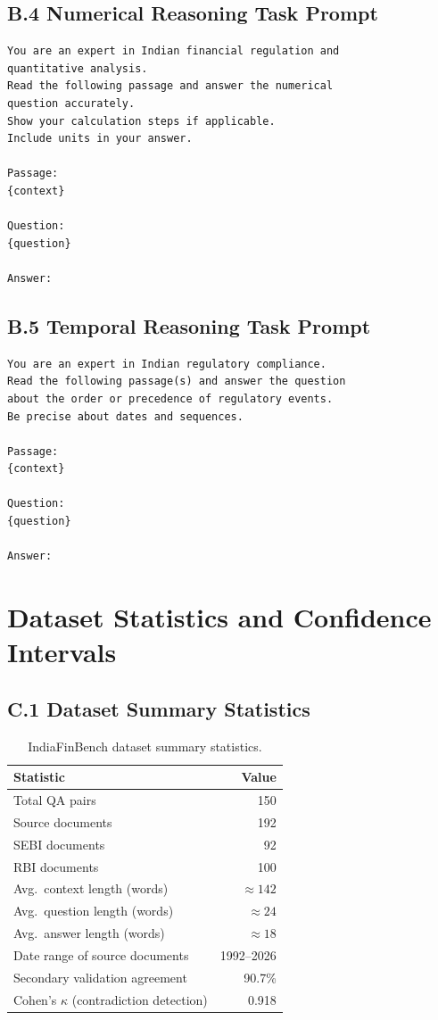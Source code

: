 \documentclass[11pt]{article}
\begin{document}
\subsection*{B.4 Numerical Reasoning Task Prompt}

\begin{verbatim}
You are an expert in Indian financial regulation and
quantitative analysis.
Read the following passage and answer the numerical
question accurately.
Show your calculation steps if applicable.
Include units in your answer.

Passage:
{context}

Question:
{question}

Answer:
\end{verbatim}

\subsection*{B.5 Temporal Reasoning Task Prompt}

\begin{verbatim}
You are an expert in Indian regulatory compliance.
Read the following passage(s) and answer the question
about the order or precedence of regulatory events.
Be precise about dates and sequences.

Passage:
{context}

Question:
{question}

Answer:
\end{verbatim}

\section{Dataset Statistics and Confidence Intervals}
\label{app:confidence_intervals}

\subsection*{C.1 Dataset Summary Statistics}

\begin{table}[h]
\centering
\caption{IndiaFinBench dataset summary statistics.}
\begin{tabular}{lr}
\toprule
\textbf{Statistic} & \textbf{Value} \\
\midrule
Total QA pairs & 150 \\
Source documents & 192 \\
SEBI documents & 92 \\
RBI documents & 100 \\
Avg.\ context length (words) & ${\approx}142$ \\
Avg.\ question length (words) & ${\approx}24$ \\
Avg.\ answer length (words) & ${\approx}18$ \\
Date range of source documents & 1992--2026 \\
Secondary validation agreement & 90.7\% \\
Cohen's $\kappa$ (contradiction detection) & 0.918 \\
\bottomrule
\end{tabular}
\end{table}
\end{document}
